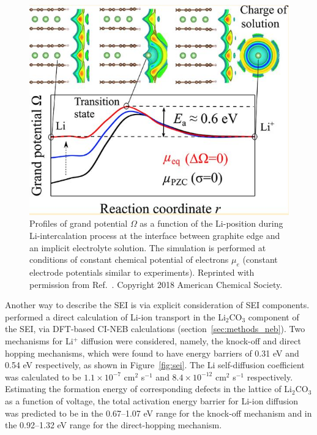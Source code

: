 \documentclass[../main.tex]{subfiles}
\begin{document}
\begin{figure}
    \centering
    \includegraphics[scale=0.6]{figures/graphite-interface.JPG}
    \caption{Profiles of grand potential $\Omega$ as a function of the Li-position during Li-intercalation process at the interface between graphite edge and an implicit electrolyte solution. The simulation is performed at conditions of constant chemical potential of electrons $\mu_e$ (constant electrode potentials similar to experiments). Reprinted with permission from Ref.~. Copyright 2018 American Chemical Society.}
    \label{fig:gel}
\end{figure}

Another way to describe the SEI is via explicit consideration of SEI components. \citeauthor{Shi2012} performed a direct calculation of Li-ion transport in the Li$_2$CO$_3$ component of the SEI,\cite{Shi2012} via DFT-based CI-NEB calculations (section~\ref{sec:methods_neb}). Two mechanisms for Li$^+$ diffusion were considered, namely, the knock-off and direct hopping mechanisms, which were found to have energy barriers of 0.31 eV and 0.54 eV respectively, as shown in Figure~\ref{fig:sei}. The Li self-diffusion coefficient was calculated to be $1.1\times10^{-7}$ cm$^2$ s$^{-1}$ and $8.4\times10^{-12}$ cm$^2$ s$^{-1}$ respectively. Estimating the formation energy of corresponding defects in the lattice of Li$_2$CO$_3$ as a function of voltage, the total activation energy barrier for Li-ion diffusion was predicted to be in the 0.67--1.07 eV range for the knock-off mechanism and in the 0.92--1.32 eV range for the direct-hopping mechanism.
\end{document}
